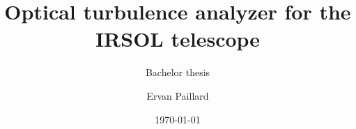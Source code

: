 \author{Ervan Paillard}


\title{Optical turbulence analyzer for the IRSOL telescope}

\subtitle{Bachelor thesis}


\date{\today}


